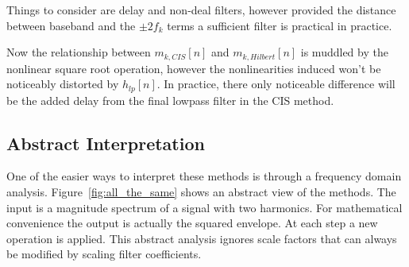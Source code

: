 \documentclass [11pt, proquest,oneside] {ganter_thesis}[2015/03/03]
\begin{document}
Things to consider are delay and non-deal filters, however provided the distance between baseband and the $\pm2f_k$ terms a sufficient filter is practical in practice.

Now the relationship between $m_{k,CIS}[n]$ and $m_{k,Hilbert}[n]$ is muddled by the nonlinear square root operation, however the nonlinearities induced won't be noticeably distorted by $h_{lp}[n]$.  In practice, there only noticeable difference will be the added delay from the final lowpass filter in the CIS method.

\subsection{Abstract Interpretation}

One of the easier ways to interpret these methods is through a frequency domain analysis.  Figure~\ref{fig:all_the_same} shows an abstract view of the methods.  The input is a magnitude spectrum of a signal with two harmonics. For mathematical convenience the output is actually the squared envelope.  At each step a new operation is applied.  This abstract analysis ignores scale factors that can always be modified by scaling filter coefficients.
\end{document}
